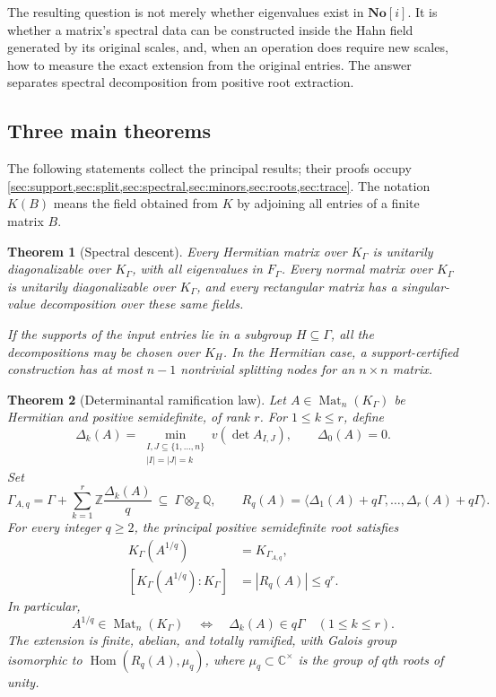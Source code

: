 \documentclass[11pt,letterpaper]{article}
\numberwithin{equation}{section}
\newtheorem{theorem}{Theorem}[section]
\theoremstyle{definition}
\theoremstyle{remark}
\newcommand{\C}{\mathbb C}
\newcommand{\Q}{\mathbb Q}
\newcommand{\Z}{\mathbb Z}
\newcommand{\SC}{\mathbf{No}[i]}
\newcommand{\Mat}{\operatorname{Mat}}
\newcommand{\Hom}{\operatorname{Hom}}
\newcommand{\ang}[1]{\langle#1\rangle}
\newcommand{\KG}{K_{\Gamma}}
\newcommand{\FG}{F_{\Gamma}}
\begin{document}
The resulting question is not merely whether eigenvalues exist in $\SC$.
It is whether a matrix's spectral data can be constructed inside the Hahn
field generated by its original scales, and, when an operation does require
new scales, how to measure the exact extension from the original entries.
The answer separates spectral decomposition from positive root extraction.

\subsection{Three main theorems}

The following statements collect the principal results; their proofs occupy
\cref{sec:support,sec:split,sec:spectral,sec:minors,sec:roots,sec:trace}.
The notation $K(B)$ means the field obtained from $K$ by adjoining all entries
of a finite matrix $B$.

\begin{theorem}[Spectral descent]\label{thm:headline-descent}
Every Hermitian matrix over $\KG$ is unitarily diagonalizable over $\KG$,
with all eigenvalues in $\FG$. Every normal matrix over $\KG$ is unitarily
diagonalizable over $\KG$, and every rectangular matrix has a singular-value
decomposition over these same fields.

If the supports of the input entries lie in a subgroup $H\subseteq\Gamma$,
all the decompositions may be chosen over $K_H$. In the Hermitian case,
a support-certified construction has at most $n-1$ nontrivial splitting
nodes for an $n\times n$ matrix.
\end{theorem}

\begin{theorem}[Determinantal ramification law]\label{thm:headline-root}
Let $A\in\Mat_n(\KG)$ be Hermitian and positive semidefinite, of rank $r$.
For $1\le k\le r$, define
\begin{equation}\label{eq:delta-intro}
 \Delta_k(A)=\min_{\substack{I,J\subseteq\{1,\ldots,n\}\\|I|=|J|=k}}
          v(\det A_{I,J}),\qquad \Delta_0(A)=0.
\end{equation}
Set
\begin{equation}\label{eq:root-group-intro}
 \Gamma_{A,q}=\Gamma+\sum_{k=1}^{r}\Z\frac{\Delta_k(A)}q
       \ \subseteq\ \Gamma\otimes_\Z\Q,
 \qquad
 R_q(A)=\ang{\Delta_1(A)+q\Gamma,\ldots,\Delta_r(A)+q\Gamma}.
\end{equation}
For every integer $q\ge2$, the principal positive semidefinite root satisfies
\begin{align}
 \KG(A^{1/q})&=K_{\Gamma_{A,q}},\label{eq:field-main}\\
 [\KG(A^{1/q}):\KG]&=|R_q(A)|\le q^r.\label{eq:degree-main}
\end{align}
In particular,
\begin{equation}\label{eq:criterion-main}
 A^{1/q}\in\Mat_n(\KG)
 \quad\Longleftrightarrow\quad
 \Delta_k(A)\in q\Gamma\quad(1\le k\le r).
\end{equation}
The extension is finite, abelian, and totally ramified, with Galois group
isomorphic to $\Hom(R_q(A),\mu_q)$, where $\mu_q\subset\C^\times$ is the group
of $q$th roots of unity.
\end{theorem}
\end{document}
